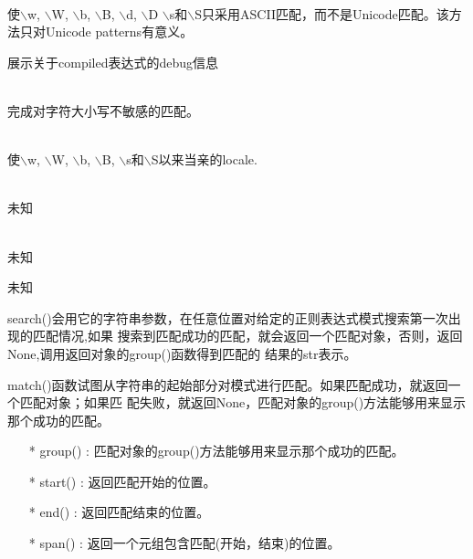 \noindent{\color{red}{re.A:}}\\
\noindent{\color{red}{re.ASCII:}}
\par{使$\backslash$w, $\backslash$W, $\backslash$b, $\backslash$B, $\backslash$d, $\backslash$D
  $\backslash$s和$\backslash$S只采用ASCII匹配，而不是Unicode匹配。该方法只对Unicode
patterns有意义。}\\

\noindent{\color{red}{re.DEBUG:}}
\par{展示关于compiled表达式的debug信息}\\

\noindent{\color{red}{re.I:}}\\
\noindent{\color{red}{re.IGNORECASE:}}
\par{完成对字符大小写不敏感的匹配。}\\

\noindent{\color{red}{re.L:}}\\
\noindent{\color{red}{re.LOCAL:}}
\par{使$\backslash$w, $\backslash$W, $\backslash$b, $\backslash$B,
$\backslash$s和$\backslash$S以来当亲的locale.}\\

\noindent{\color{red}{re.M:}}\\
\noindent{\color{red}{re.MULTILINE:}}
\par{未知}\\

\noindent{\color{red}{re.S:}}\\
\noindent{\color{red}{re.DOTALL:}}
\par{未知}\\

\noindent{\color{red}{re.X:}}
\noindent{\color{red}{re.VERBOSE:}}
\par{未知}\\

\noindent{\color{red}{re.seach(pattern, string, flags=0):}}
\par{search()会用它的字符串参数，在任意位置对给定的正则表达式模式搜索第一次出现的匹配情况,如果
搜索到匹配成功的匹配，就会返回一个匹配对象，否则，返回None,调用返回对象的group()函数得到匹配的
结果的str表示。}\\

\noindent{\color{red}{re.match(pattern, string, flags=0):}}
\par{match()函数试图从字符串的起始部分对模式进行匹配。如果匹配成功，就返回一个匹配对象；如果匹
配失败，就返回None，匹配对象的group()方法能够用来显示那个成功的匹配。}\\
\begin{itemize}
\item[*]{group() : 匹配对象的group()方法能够用来显示那个成功的匹配。}
\item[*]{start() : 返回匹配开始的位置。}
\item[*]{end() : 返回匹配结束的位置。}
\item[*]{span() : 返回一个元组包含匹配(开始，结束)的位置。}
\end{itemize}

